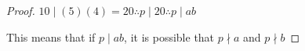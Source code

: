 \documentclass[11pt]{article}
\begin{document}
\begin{enumerate}
\begin{enumerate}
\begin{proof}
$10\mid (5)(4)=20 \therefore p\mid 20 \therefore p\mid ab$\newline

This means that if $p\mid ab$, it is possible that $p\nmid a$ and $p\nmid b$
  \end{proof}
  \end{enumerate}
\end{enumerate}
\end{document}
